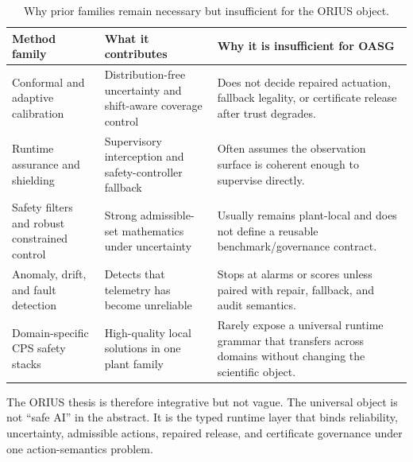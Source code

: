 \begin{table}[t]
\centering
\small
\caption{Why prior families remain necessary but insufficient for the ORIUS object.}
\label{tab:prof-family-gap}
\begin{tabularx}{\textwidth}{@{}p{}p{}p{}@{}}
\toprule
\textbf{Method family} & \textbf{What it contributes} & \textbf{Why it is insufficient for OASG} \\
\midrule
Conformal and adaptive calibration & Distribution-free uncertainty and shift-aware coverage control & Does not decide repaired actuation, fallback legality, or certificate release after trust degrades. \\
Runtime assurance and shielding & Supervisory interception and safety-controller fallback & Often assumes the observation surface is coherent enough to supervise directly. \\
Safety filters and robust constrained control & Strong admissible-set mathematics under uncertainty & Usually remains plant-local and does not define a reusable benchmark/governance contract. \\
Anomaly, drift, and fault detection & Detects that telemetry has become unreliable & Stops at alarms or scores unless paired with repair, fallback, and audit semantics. \\
Domain-specific CPS safety stacks & High-quality local solutions in one plant family & Rarely expose a universal runtime grammar that transfers across domains without changing the scientific object. \\
\bottomrule
\end{tabularx}
\end{table}

The ORIUS thesis is therefore integrative but not vague. The universal object is not
``safe AI'' in the abstract. It is the typed runtime layer that binds reliability,
uncertainty, admissible actions, repaired release, and certificate governance under one
action-semantics problem.
